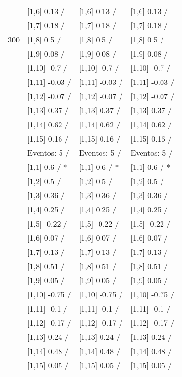 \begin{table}
\begin{tabular}[t]{llll}
 & {}[1,6] 0.13  / & {}[1,6] 0.13  / & {}[1,6] 0.13  /\\
 & {}[1,7] 0.18  / & {}[1,7] 0.18  / & {}[1,7] 0.18  /\\
300 & {}[1,8] 0.5  / & {}[1,8] 0.5  / & {}[1,8] 0.5  /\\
\addlinespace
 & {}[1,9] 0.08  / & {}[1,9] 0.08  / & {}[1,9] 0.08  /\\
 & {}[1,10] -0.7  / & {}[1,10] -0.7  / & {}[1,10] -0.7  /\\
 & {}[1,11] -0.03  / & {}[1,11] -0.03  / & {}[1,11] -0.03  /\\
 & {}[1,12] -0.07  / & {}[1,12] -0.07  / & {}[1,12] -0.07  /\\
 & {}[1,13] 0.37  / & {}[1,13] 0.37  / & {}[1,13] 0.37  /\\
\addlinespace
 & {}[1,14] 0.62  / & {}[1,14] 0.62  / & {}[1,14] 0.62  /\\
 & {}[1,15] 0.16  / & {}[1,15] 0.16  / & {}[1,15] 0.16  /\\
 & Eventos:  5 / & Eventos:  5 / & Eventos:  5 /\\
 & {}[1,1] 0.6  / * & {}[1,1] 0.6  / * & {}[1,1] 0.6  / *\\
 & {}[1,2] 0.5  / & {}[1,2] 0.5  / & {}[1,2] 0.5  /\\
\addlinespace
 & {}[1,3] 0.36  / & {}[1,3] 0.36  / & {}[1,3] 0.36  /\\
 & {}[1,4] 0.25  / & {}[1,4] 0.25  / & {}[1,4] 0.25  /\\
 & {}[1,5] -0.22  / & {}[1,5] -0.22  / & {}[1,5] -0.22  /\\
 & {}[1,6] 0.07  / & {}[1,6] 0.07  / & {}[1,6] 0.07  /\\
 & {}[1,7] 0.13  / & {}[1,7] 0.13  / & {}[1,7] 0.13  /\\
\addlinespace
500 & {}[1,8] 0.51  / & {}[1,8] 0.51  / & {}[1,8] 0.51  /\\
 & {}[1,9] 0.05  / & {}[1,9] 0.05  / & {}[1,9] 0.05  /\\
 & {}[1,10] -0.75  / & {}[1,10] -0.75  / & {}[1,10] -0.75  /\\
 & {}[1,11] -0.1  / & {}[1,11] -0.1  / & {}[1,11] -0.1  /\\
 & {}[1,12] -0.17  / & {}[1,12] -0.17  / & {}[1,12] -0.17  /\\
\addlinespace
 & {}[1,13] 0.24  / & {}[1,13] 0.24  / & {}[1,13] 0.24  /\\
 & {}[1,14] 0.48  / & {}[1,14] 0.48  / & {}[1,14] 0.48  /\\
 & {}[1,15] 0.05  / & {}[1,15] 0.05  / & {}[1,15] 0.05  /\\
\bottomrule
\end{tabular}
\end{table}

